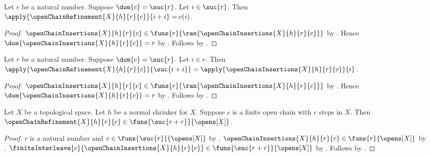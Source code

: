 \begin{proposition}\label{open_chain_refinement_even}
    Let $r$ be a natural number.
    Suppose $\dom{c}=\suc{r}$.
    Let $i\in\suc{r}$.
    Then $\apply{\openChainRefinement{X}{h}{r}{c}}{i+i}=c(i)$.
\end{proposition}
\begin{proof}
    $\openChainInsertions{X}{h}{r}{c}
        \in\funs{r}{\ran{\openChainInsertions{X}{h}{r}{c}}}$
        by .
    Hence $\dom{\openChainInsertions{X}{h}{r}{c}}=r$
        by .
    Follows by .
\end{proof}

\begin{proposition}\label{open_chain_refinement_odd}
    Let $r$ be a natural number.
    Suppose $\dom{c}=\suc{r}$.
    Let $i\in r$.
    Then $\apply{\openChainRefinement{X}{h}{r}{c}}{\suc{i+i}}
        =\apply{\openChainInsertions{X}{h}{r}{c}}{i}$.
\end{proposition}
\begin{proof}
    $\openChainInsertions{X}{h}{r}{c}
        \in\funs{r}{\ran{\openChainInsertions{X}{h}{r}{c}}}$
        by .
    Hence $\dom{\openChainInsertions{X}{h}{r}{c}}=r$
        by .
    Follows by .
\end{proof}

\begin{proposition}\label{open_chain_refinement_typed}
    Let $X$ be a topological space.
    Let $h$ be a normal shrinker for $X$.
    Suppose $c$ is a finite open chain with $r$ steps in $X$.
    Then $\openChainRefinement{X}{h}{r}{c}
        \in\funs{\suc{r+r}}{\opens[X]}$.
\end{proposition}
\begin{proof}
    $r$ is a natural number and
        $c\in\funs{\suc{r}}{\opens[X]}$
        by .
    $\openChainInsertions{X}{h}{r}{c}
        \in\funs{r}{\opens[X]}$
        by .
    $\finiteInterleave{c}{\openChainInsertions{X}{h}{r}{c}}
        \in\funs{\suc{r+r}}{\opens[X]}$
        by .
    Follows by .
\end{proof}

